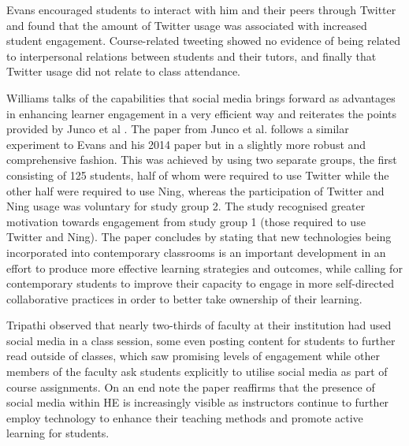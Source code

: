 \documentclass[lettersize,journal]{IEEEtran}
\begin{document}
    Evans \cite{Evans2014} encouraged students to interact with him and their peers through
    Twitter and found that the amount of Twitter usage was associated with increased student
    engagement. Course-related tweeting showed no evidence of being related to interpersonal
    relations between students and their tutors, and finally that Twitter usage did not relate
    to class attendance.

    Williams \cite{Williams2022} talks of the capabilities that social media brings
    forward as advantages in enhancing learner engagement in a very efficient way
    and reiterates the points provided by Junco et al \cite{Junco et al 2013}.
    The paper from Junco et al. follows a similar experiment to Evans and his 2014
    paper \cite{Evans2014} but in a slightly more robust and comprehensive fashion.
    This was achieved by using two separate groups, the first consisting of 125
    students, half of whom were required to use Twitter while the other half were
    required to use Ning, whereas the participation of Twitter and Ning usage was
    voluntary for study group 2. The study recognised greater motivation towards
    engagement from study group 1 (those required to use Twitter and Ning). The
    paper concludes by stating that new technologies being incorporated into contemporary
    classrooms is an important development in an effort to produce more effective
    learning strategies and outcomes, while calling for contemporary students to
    improve their capacity to engage in more self-directed collaborative practices
    in order to better take ownership of their learning.

    Tripathi \cite{Tripathi 2022} observed that nearly two-thirds of faculty at
    their institution had used social media in a class session, some even
    posting content for students to further read outside of classes, which saw
    promising levels of engagement while other members of the faculty ask students
    explicitly to utilise social media as part of course assignments. On an end
    note the paper reaffirms that the presence of social media within HE is
    increasingly visible as instructors continue to further employ technology
    to enhance their teaching methods and promote active learning for students.
\end{document}
